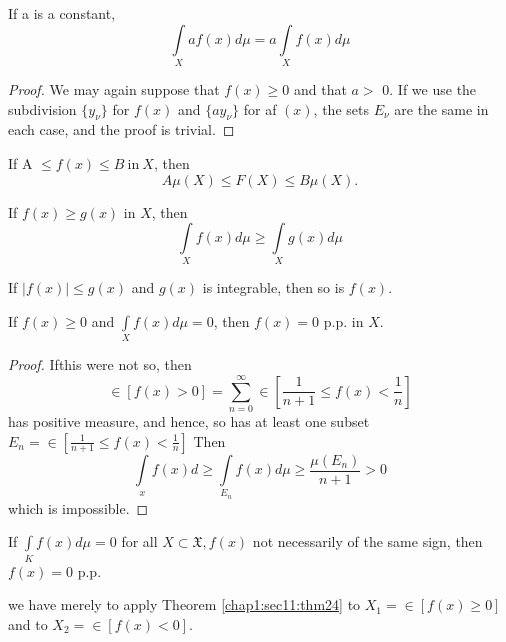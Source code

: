 \begin{theorem}\label{chap1:sec11:thm21} 
  If a is a constant,
  $$ 
  \int\limits_{X} a f(x) d \mu =a  \int\limits_{X} f(x) d \mu 
  $$
\end{theorem}

\begin{proof}
  We may again suppose that $ f(x) \ge  0 $ and that  $a
  > $ 0. If we use the subdivision  $ \{ y_{\nu}\} $ 
  for  $f(x)$ and $ \{ ay_{\nu} \} $ for af $(x)$, the sets  $E_\nu$  are the
  same in each case, and the proof is trivial.  
\end{proof}

\begin{theorem}\label{chap1:sec11:thm22} 
If   A $ \leq   f(x) \leq  B ~\text{in}~ X$, then 
 $$
 A \mu (X) \leq  F(X) \leq   B  \mu  (X).  
 $$
\end{theorem}

\begin{theorem}\label{chap1:sec11:thm23} 
If $f(x) \ge   g(x)$ in $X$, then 
$$
  \int\limits_{X} f(x) d \mu \geq  \int\limits_{X} g(x) d \mu 
$$
\end{theorem}

\begin{coro*} 
  If $ \mid  f(x) \mid \leq g(x)$ and $g(x)$ is
  integrable, then so is $f(x)$. 
\end{coro*}

\begin{theorem}\label{chap1:sec11:thm24} 
If  $f(x) \geq 0 $ and  $\int \limits_{X} f(x) d \mu  = 0$, then
$ f(x) =0$ p.p. in $X$. 
\end{theorem}

\begin{proof}
  If\pageoriginale this were not so, then 
  $$
  \in[ f(x)  >  0 ]= \sum_{n=0}^\infty \in \left[\frac{1}{n+1} \leq f(x) <
    \frac{1}{n} \right]
  $$
  has positive measure, and hence, so has at least one subset
  $E_n =\in \left[\frac{1}{n+1} \leq f(x) < \frac{1}{n} \right]$ Then
  $$			
  \int \limits_{x} f(x)d \geq \int \limits_{E_n} f(x)d \mu \geq
  \frac{\mu(E_n)}{n+1} >0  
  $$
  which is impossible.
\end{proof}

\setcounter{corollary}{0}
\begin{corollary}\label{chap1:sec11:coro1} 
  If $\int\limits_K  f(x)d \mu = 0 $ for all $X\subset
  \mathfrak{X}, f(x)$ not necessarily of the same sign, then $f(x) = 0$
  p.p. 
  
  we have merely to apply Theorem \ref{chap1:sec11:thm24} to $X_1 =
  \in[ f(x)  \geq 0 ]$ and to $X_2 = \in [ f(x)  <  0]$. 
\end{corollary}


